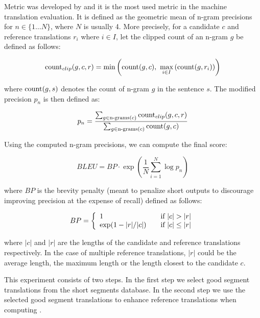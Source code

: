 Metric  was developed by  and it is the
most used metric in the machine translation evaluation. It is defined as the
geometric mean of n-gram precisions for $n \in \{1 \ldots N\}$, where $N$ is
usually 4. More precisely, for a candidate $c$ and reference translations $r_i$
where $i \in I$, let the clipped count of an n-gram $g$ be defined as follows:

\begin{equation*}
    \text{count}_{clip}(g,c,r) = \min \left( \operatorname{count}(g, c), ~ \max_{i \in I} \left( \operatorname{count}(g, r_i) \right) \right)
\end{equation*}

\noindent where $\operatorname{count}(g, s)$ denotes the count of n-gram $g$ in the sentence
$s$. The modified precision $p_n$ is then defined as:

\begin{equation*}
    p_n = \frac{
        \sum_{g \in \text{n-grams}(c)} \text{count}_{clip}(g,c,r)
    }{
        \sum_{g \in \text{n-grams}(c)} \operatorname{count}(g,c)
    }
\end{equation*}

\noindent Using the computed n-gram precisions, we can compute the final
 score:

\begin{equation*}
        BLEU = BP \cdot \exp \left( \frac{1}{N} \sum_{i = 1}^N \log p_n \right) 
\end{equation*}

\noindent where $BP$ is the brevity penalty (meant to penalize short outputs to
discourage improving precision at the expense of recall) defined as follows:

\begin{equation*}
    BP = \left\{ 
  \begin{array}{l l}
    1 & \quad \text{if } |c| > |r|\\
    \exp(1-|r|/|c|) & \quad \text{if } |c| \leq |r| \\
    \end{array} \right.
\end{equation*}

\noindent where $|c|$ and $|r|$ are the lengths of the candidate and reference
translations respectively. In the case of multiple reference translations,
$|r|$ could be the average length, the maximum length or the length closest to
the candidate $c$.

This experiment consists of two steps. In the first step we select good segment
translations from the short segments database. In the second step we use the
selected good segment translations to enhance reference translations when
computing .

